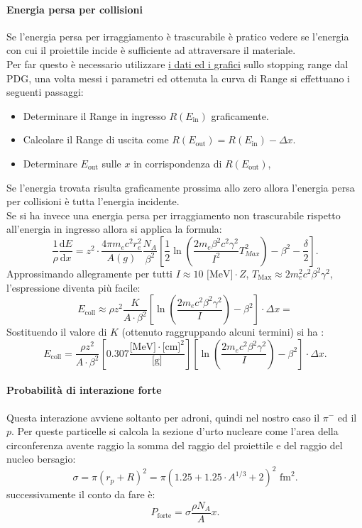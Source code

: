 \paragraph{Energia persa per collisioni}%
Se l'energia persa per irraggiamento è trascurabile è pratico vedere se l'energia con cui il proiettile incide è sufficiente ad attraversare il materiale.\\
Per far questo è necessario utilizzare \href{https://www.nist.gov/pml/stopping-power-range-tables-electrons-protons-and-helium-ions}{i dati ed i grafici} sullo stopping range dal PDG, una volta messi i parametri ed ottenuta la curva di Range si effettuano i seguenti passaggi:
\begin{itemize}
	\item Determinare il Range in ingresso $R\left( E_{\text{in}}\right)$ graficamente.
	\item Calcolare il Range di uscita come $R\left( E_{\text{out}} \right)= R\left( E_{\text{in}} \right) - \Delta x$.
	\item Determinare $E_{\text{out}}$ sulle $x$ in corrispondenza di $R\left( E_{\text{out}} \right)$,
\end{itemize}
Se l'energia trovata risulta graficamente prossima allo zero allora l'energia persa per collisioni è tutta l'energia incidente.\\
Se si ha invece una energia persa per irraggiamento non trascurabile rispetto all'energia in ingresso allora si applica la formula:
\[
	\frac{1}{\rho} \frac{\mbox{d} E}{\mbox{d} x} = z^2\cdot \frac{4\pi m_{e}c^2r_{e}^2}{A\left( g \right)} \frac{N_{A}}{\beta^2} 
	\left[\frac{1}{2}\ln\left(\frac{2m_{e}\beta^2c^2\gamma^2}{I^2}T_{Max}^2\right) -\beta^2 -\frac{\delta}{2} \right] 
.\] 
Approssimando allegramente per tutti $I \approx 10 \text{ [MeV]}\cdot Z$, $T_{\text{Max}}\approx 2m_{e}^2c^2\beta^2\gamma^2$, l'espressione diventa più facile:
\[
	E_{\text{coll}} \approx \rho z^2 \frac{K}{A\cdot \beta^2} \left[ \ln\left( \frac{2m_{e}c^2\beta^2\gamma^2}{I}\right) -\beta^2 \right] \cdot \Delta x = 
\]
Sostituendo il valore di $K$ (ottenuto raggruppando alcuni termini) si ha :
\[
	E_{\text{coll}}=  \frac{\rho z^2}{A\cdot \beta^2} \left[ 0.307\frac{\text{[MeV]}\cdot\text{[cm]}^2}{\text{[g]}} \right] \left[ \ln\left( \frac{2m_{e}c^2\beta^2\gamma^2}{I}\right) -\beta^2 \right] \cdot \Delta x 
.\] 

\paragraph{Probabilità di interazione forte}%
Questa interazione avviene soltanto per adroni, quindi nel nostro caso il $\pi^{-}$ ed il $p$. Per queste particelle si calcola la sezione d'urto nucleare come l'area della circonferenza avente raggio la somma del raggio del proiettile e del raggio del nucleo bersagio:
\[
	\sigma=\pi\left( r_{p}+R \right)^2 = \pi\left( 1.25 + 1.25\cdot A^{1/3} + 2 \right)^2 \text{ fm}^2 
.\] 
successivamente il conto da fare è:
\[
	P_{\text{forte}}= \sigma \frac{\rho N_{A}}{A}x
.\] 

